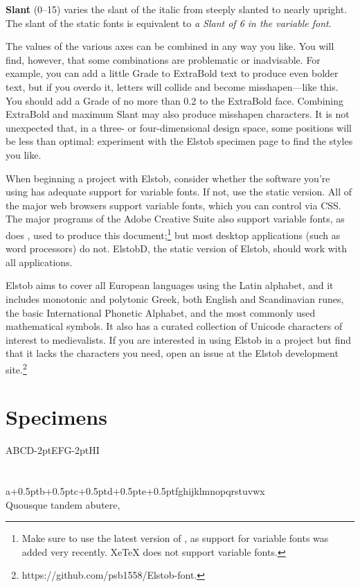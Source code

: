 \documentclass[12pt,letterpaper,openany]{book}
\begin{document}
\textbf{Slant} (0--15) varies
the slant of the italic from { steeply slanted} to { nearly upright}. The slant of the static fonts is
equivalent to \textit{a Slant of 6 in the variable font}.

The values of the various axes can be combined in any way you like. You will find,
however, that some combinations are problematic or inadvisable. For example,
you can add a little Grade to ExtraBold text to produce {\superbold even
bolder text}, but if you overdo it, letters will collide and become
misshapen---{\waytoobold like this}. You should add a Grade of no more than 0.2
to the ExtraBold face.
Combining ExtraBold and maximum Slant may also produce misshapen characters. It
is not unexpected that, in a three- or four-dimensional design space, some positions
will be less than optimal: experiment with the Elstob specimen page to find the
styles you like.

When beginning a project with Elstob, consider whether the software you’re using
has adequate support for variable fonts. If not, use the static version.
All of the major web browsers support variable fonts, which you can control via
CSS. The major programs of the Adobe Creative Suite also support variable fonts,
as does {\ltech}, used to produce this document;\footnote{Make sure to use the
latest version of {\ltech}, as support for variable fonts was added very
recently. XeTeX does not support variable fonts.} but most desktop applications
(such as word processors) do not. ElstobD, the static version of Elstob,
should work with all applications.

Elstob aims to cover all European languages using the Latin alphabet, and it includes
monotonic and polytonic Greek, both English and Scandinavian runes,
the basic International Phonetic Alphabet, and the most commonly used
mathematical symbols. It also has a curated collection of Unicode characters of
interest to medievalists. If you are interested in using Elstob in a project
but find that it lacks the characters you need, open an issue at the Elstob
development site.\footnote{https://github.com/psb1558/Elstob-font.}\pagebreak

\chapter{Specimens}

{\fontsize{72pt}{72pt}\selectfont ABCD\kern-2ptEFG\kern-2ptHI\\[0.3ex]
\fontsize{58}{58}\selectfont{}\\[0.1ex]
\fontsize{48}{48}\selectfont{}\\[0.4ex]
\fontsize{36}{36}\selectfont{}a\kern+0.5ptb\kern+0.5ptc\kern+0.5ptd\kern+0.5pte\kern+0.5ptfghijklmnopqrstuvwx\\[0.1ex]
Quousque tandem abutere, \linebreak
\italslanted {}\linebreak
{} }
\end{document}
